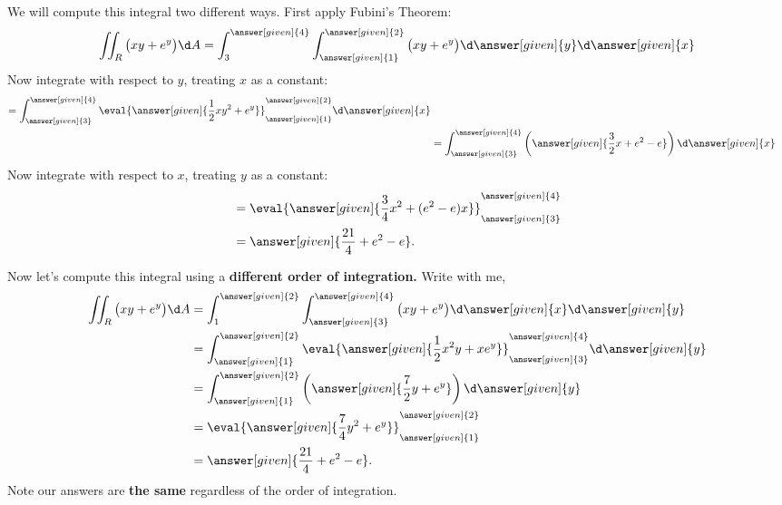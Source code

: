 \documentclass{ximera}
\begin{document}
\begin{example}
\begin{image}
  \end{image}
  \begin{explanation}
    We will compute this integral two different ways. First apply Fubini's Theorem:
    \[
    \iint_R \big(xy+e^y\big) \d A = \int_3^{\answer[given]{4}}\int_{\answer[given]{1}}^{\answer[given]{2}}\big(xy+e^y\big) \d \answer[given]{y} \d \answer[given]{x}
    \]
    Now integrate with respect to $y$, treating $x$ as a constant:
    \begin{align*}
    = \int_{\answer[given]{3}}^{\answer[given]{4}} \eval{\answer[given]{\frac{1}{2}xy^2+e^y}}_{\answer[given]{1}}^{\answer[given]{2}} \d \answer[given]{x} \\
    &= \int_{\answer[given]{3}}^{\answer[given]{4}}\left(\answer[given]{\frac{3}{2}x + e^2-e}\right)\d \answer[given]{x}
    \end{align*}
    Now integrate with respect to $x$, treating $y$ as a constant:
    \begin{align*}
      &= \eval{\answer[given]{\frac{3}{4}x^2 + (e^2-e)x}}_{\answer[given]{3}}^{\answer[given]{4}} \\
      &= \answer[given]{\frac{21}{4}+ e^2-e}.
    \end{align*}

    
  Now let's compute this integral using a \textbf{different order of
  integration.} Write with me,
  \begin{align*}
    \iint_R\big(xy+e^y\big) \d A &= \int_1^{\answer[given]{2}}\int_{\answer[given]{3}}^{\answer[given]{4}}\big(xy+e^y\big)\d \answer[given]{x} \d \answer[given]{y} \\
    &= \int_{\answer[given]{1}}^{\answer[given]{2}}\eval{\answer[given]{\frac{1}{2}x^2y+xe^y}}_{\answer[given]{3}}^{\answer[given]{4}}\d \answer[given]{y}\\
    &= \int_{\answer[given]{1}}^{\answer[given]{2}}\left(\answer[given]{\frac{7}{2}y+e^y}\right)\d \answer[given]{y}\\
    &= \eval{\answer[given]{\frac{7}{4}y^2+e^y}}_{\answer[given]{1}}^{\answer[given]{2}}\\
    &=\answer[given]{\frac{21}{4}+e^2-e}.
  \end{align*}
  Note our answers are \textbf{the same} regardless of the order of
  integration.
  \end{explanation}
\end{example}
\end{document}
